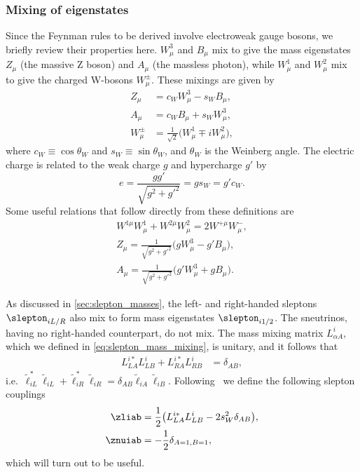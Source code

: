 \subsubsection{Mixing of eigenstates}
Since the Feynman rules to be derived involve electroweak gauge bosons, we briefly review their properties here.
$W^3_\mu$ and $B_\mu$ mix to give the mass eigenstates $Z_\mu$ (the massive Z boson) and $A_\mu$ (the massless photon), while $W^1_\mu$ and $W^2_\mu$ mix to give the charged W-bosons $W^\pm_\mu$. These mixings are given by
\begin{subequations}
    \begin{align}
        Z_\mu &= c_W W^3_\mu - s_W B_\mu, \label{eq:ew_Z}
        \\
        A_\mu &= c_W B_\mu + s_W W^3_\mu, \label{eq:ew_A}
        \\
        W^\pm_\mu &= \frac{1}{\sqrt{2}} \bigl( W^1_\mu \mp iW^2_\mu \bigr) \label{eq:ew_W},
    \end{align}
\end{subequations}
where $c_W \equiv \cos\theta_W$ and $s_W \equiv \sin\theta_W$, and $\theta_W$ is the Weinberg angle.
The electric charge is related to the weak charge $g$ and hypercharge $g'$ by
\begin{equation*}
    e = \frac{gg'}{\sqrt{g^2+g'^2}} = gs_W = g'c_W.
\end{equation*}
Some useful relations that follow directly from these definitions are
\begin{subequations}
    \begin{gather}
        W^{1\mu}W^1_\mu + W^{2\mu}W^2_\mu = 2W^{+\mu}W^-_\mu, \label{eq:W12_squared}
        \\
        Z_\mu = \frac{1}{\sqrt{g^2+g'^2}} \bigl( gW^3_\mu - g'B_\mu \bigr),
        \\
        A_\mu = \frac{1}{\sqrt{g^2+g'^2}} \bigl( g'W^3_\mu + gB_\mu \bigr).
    \end{gather}
\end{subequations}

As discussed in \cref{sec:slepton_masses}, the left- and right-handed sleptons $\slepton_{iL/R}$ also mix to form mass eigenstates $\slepton_{i1/2}$.
The sneutrinos, having no right-handed counterpart, do not mix.
The mass mixing matrix $L^i_{\alpha A}$, which we defined in \cref{eq:slepton_mass_mixing}, is unitary, and it follows that
\begin{align*}
    L^{i*}_{LA}L^i_{LB} + L^{i*}_{RA}L^i_{RB}
    &= \delta_{AB},
\end{align*}
i.e.\ $\tilde\ell_{iL}^*\tilde\ell_{iL}+\tilde\ell_{iR}^*\tilde\ell_{iR} = \delta_{AB}\tilde\ell_{iA}\tilde\ell_{iB}$.
Following~\cite{Richardson:2000nt} we define the following slepton couplings
\begin{subequations}
\begin{align}
    \zliab &= \frac{1}{2}\bigl( L^{i*}_{LA}L^i_{LB} - 2s_W^2 \delta_{AB} \bigr),
    \label{eq:zliab}
    \\
    \znuiab &= -\frac{1}{2}\delta_{A=1,B=1},
    \label{eq:znuiab}
\end{align}
\end{subequations}
which will turn out to be useful.


